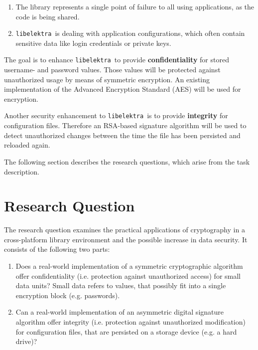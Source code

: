 \documentclass[a4paper,12pt]{article}
\newcommand{\libelektra}{\texttt{libelektra}~}
\begin{document}
\begin{enumerate}
\item The library represents a single point of failure to all using applications, as the code is being shared.
\item \libelektra is dealing with application configurations, which often contain sensitive data like login credentials or private keys.
\end{enumerate}

The goal is to enhance \libelektra to provide \textbf{confidentiality} for stored username- and password values.
Those values will be protected against unauthorized usage by means of symmetric encryption.
An existing implementation of the Advanced Encryption Standard (AES) will be used for encryption.

Another security enhancement to \libelektra is to provide \textbf{integrity} for configuration files.
Therefore an RSA-based signature algorithm will be used to detect unauthorized changes between the time the file has been persisted and reloaded again.

The following section describes the research questions, which arise from the task description.


\section{Research Question}

The research question examines the practical applications of cryptography in a cross-platform library environment and the possible increase in data security.
It consists of the following two parts:

\begin{enumerate}
\item Does a real-world implementation of a symmetric cryptographic algorithm offer confidentiality (i.e. protection against unauthorized access) for small data units?
Small data refers to values, that possibly fit into a single encryption block (e.g. passwords).
\item Can a real-world implementation of an asymmetric digital signature algorithm offer integrity (i.e. protection against unauthorized modification) for configuration files, that are persisted on a storage device (e.g. a hard drive)?
\end{enumerate}
\end{document}
